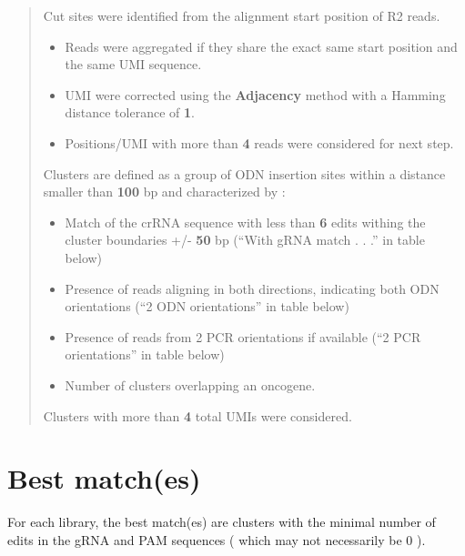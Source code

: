 \documentclass[
]{article}
\begin{document}
\begin{quote}
Cut sites were identified from the alignment start position of R2 reads.

\begin{itemize}
\item
  Reads were aggregated if they share the exact same start position and
  the same UMI sequence.
\item
  UMI were corrected using the \textbf{Adjacency} method with a Hamming
  distance tolerance of \textbf{1}.
\item
  Positions/UMI with more than \textbf{4} reads were considered for next
  step.
\end{itemize}

Clusters are defined as a group of ODN insertion sites within a distance
smaller than \textbf{100} bp and characterized by :

\begin{itemize}
\item
  Match of the crRNA sequence with less than \textbf{6} edits withing
  the cluster boundaries +/- \textbf{50} bp (``With gRNA match . . .''
  in table below)
\item
  Presence of reads aligning in both directions, indicating both ODN
  orientations (``2 ODN orientations'' in table below)
\item
  Presence of reads from 2 PCR orientations if available (``2 PCR
  orientations'' in table below)
\item
  Number of clusters overlapping an oncogene.
\end{itemize}

Clusters with more than \textbf{4} total UMIs were considered.
\end{quote}

\section{Best match(es)}\label{best-matches}

For each library, the best match(es) are clusters with the minimal
number of edits in the gRNA and PAM sequences ( which may not
necessarily be 0 ).

\begin{table}[!h]
\centering\centering
\caption{\label{tab:unnamed-chunk-5}Table 4}
\centering
{}
\end{table}
\end{document}
